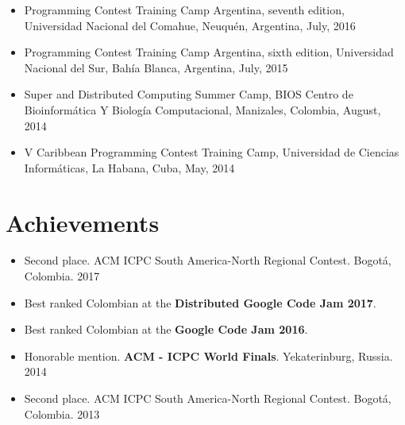 \documentclass[11pt,a4paper,sans]{moderncv}        %
\begin{document}
\begin{itemize}
  \item{Programming Contest Training Camp Argentina, seventh edition, Universidad Nacional del Comahue, Neuquén, Argentina, July, 2016}
  \item{Programming Contest Training Camp Argentina, sixth edition, Universidad Nacional del Sur, Bahía Blanca, Argentina, July, 2015}
  \item{Super and Distributed Computing Summer Camp, BIOS Centro de Bioinformática Y Biología Computacional, Manizales, Colombia, August, 2014}
  \item{V Caribbean Programming Contest Training Camp, Universidad de Ciencias Informáticas, La Habana, Cuba, May, 2014}
\end{itemize}

\section{Achievements}

\begin{itemize}
  \item{Second place. ACM ICPC South America-North Regional Contest. Bogotá, Colombia. 2017 \footnotemark[1]}
  \item{Best ranked Colombian at the \textbf{Distributed Google Code Jam 2017}. \footnotemark[3]}
  \item{Best ranked Colombian at the \textbf{Google Code Jam 2016}. \footnotemark[2]}
  \item{Honorable mention. \textbf{ACM - ICPC World Finals}. Yekaterinburg, Russia. 2014 \footnotemark[1]}
  \item{Second place. ACM ICPC South America-North Regional Contest. Bogotá, Colombia. 2013 \footnotemark[1]}
\end{itemize}

\\
\\
\end{document}

